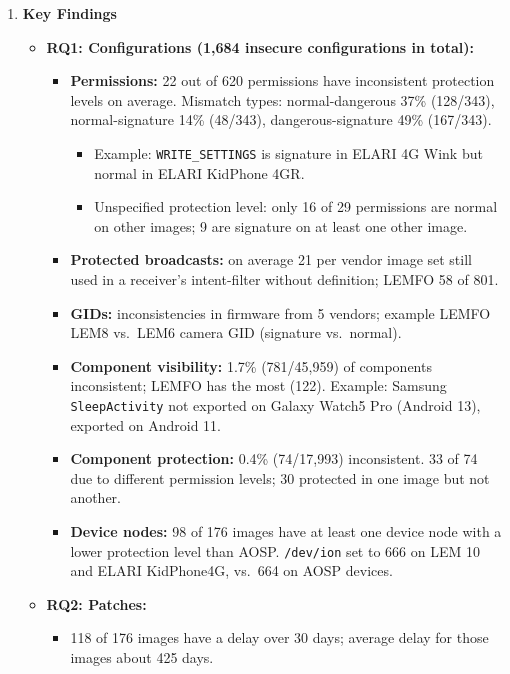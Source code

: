 \documentclass[11pt,a4paper]{article}
\newcommand{\entrypart}[1]{\textbf{\color{accent}#1}\par\vspace{2pt}}
\begin{document}
\begin{enumerate}
    \item \entrypart{Key Findings}

    \begin{itemize}[leftmargin=*,itemsep=1pt,topsep=2pt]
        \item \textbf{RQ1: Configurations (1,684 insecure configurations in total):}
        \begin{itemize}[itemsep=0pt]
            \item \textbf{Permissions:} 22 out of 620 permissions have inconsistent protection levels on average. Mismatch types: normal-dangerous 37\% (128/343), normal-signature 14\% (48/343), dangerous-signature 49\% (167/343).
            \begin{itemize}[itemsep=0pt]
                \item Example: \texttt{WRITE\_SETTINGS} is signature in ELARI 4G Wink but normal in ELARI KidPhone 4GR.
                \item Unspecified protection level: only 16 of 29 permissions are normal on other images; 9 are signature on at least one other image.
            \end{itemize}
            \item \textbf{Protected broadcasts:} on average 21 per vendor image set still used in a receiver's intent-filter without definition; LEMFO 58 of 801.
            \item \textbf{GIDs:} inconsistencies in firmware from 5 vendors; example LEMFO LEM8 vs.\ LEM6 camera GID (signature vs.\ normal).
            \item \textbf{Component visibility:} 1.7\% (781/45,959) of components inconsistent; LEMFO has the most (122). Example: Samsung \texttt{SleepActivity} not exported on Galaxy Watch5 Pro (Android 13), exported on Android 11.
            \item \textbf{Component protection:} 0.4\% (74/17,993) inconsistent. 33 of 74 due to different permission levels; 30 protected in one image but not another.
            \item \textbf{Device nodes:} 98 of 176 images have at least one device node with a lower protection level than AOSP. \texttt{/dev/ion} set to 666 on LEM 10 and ELARI KidPhone4G, vs.\ 664 on AOSP devices.
        \end{itemize}
        \item \textbf{RQ2: Patches:}
        \begin{itemize}[itemsep=0pt]
            \item 118 of 176 images have a delay over 30 days; average delay for those images about 425 days.

\end{itemize}
\end{itemize}
\end{enumerate}
\end{document}
